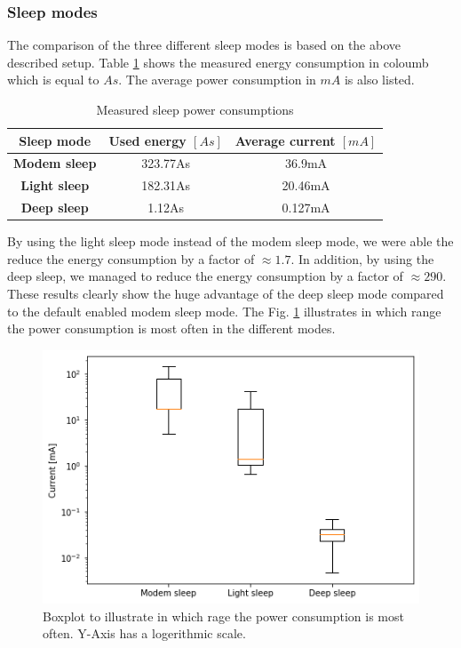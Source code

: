 \subsubsection{Sleep modes}
The comparison of the three different sleep modes is based on the above described setup.
Table \ref{tab:sleep_modes_15min} shows the measured energy consumption in coloumb which is equal to $As$.
The average power consumption in $mA$ is also listed.

\begin{table}[htbp]
\caption{Measured sleep power consumptions}
\begin{center}
\begin{tabular}{|c|c|c|}
\hline
\textbf{Sleep mode}&\textbf{Used energy $[As]$}&\textbf{Average current $[mA]$}\\
\hline
\textbf{Modem sleep} & 323.77As & 36.9mA\\
\textbf{Light sleep} & 182.31As & 20.46mA\\
\textbf{Deep sleep}  & 1.12As   & 0.127mA\\
\hline
\end{tabular}
\label{tab:sleep_modes_15min}
\end{center}
\end{table}

By using the light sleep mode instead of the modem sleep mode, we were able the reduce the energy consumption by a factor of $\approx 1.7$.
In addition, by using the deep sleep, we managed to reduce the energy consumption by a factor of $\approx 290$.
These results clearly show the huge advantage of the deep sleep mode compared to the default enabled modem sleep mode.
The Fig. \ref{fig:sleep_compare_boxplot} illustrates in which range the power consumption is most often in the different modes.

\begin{figure}[H]
    \includegraphics[width = \linewidth]{fig/sleep_compare_boxplot.png}
    \caption{Boxplot to illustrate in which rage the power consumption is most often. Y-Axis has a logerithmic scale.}
    \label{fig:sleep_compare_boxplot}
\end{figure}
